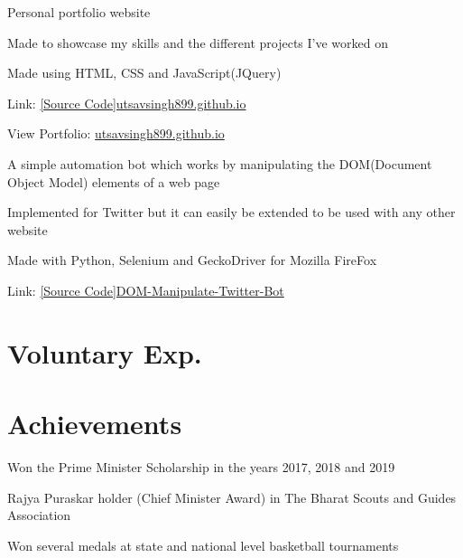 \documentclass[]{deedy-resume-openfont}
\begin{document}
\begin{minipage}[t]{0.66\textwidth}
\begin{tightemize}
\item Personal portfolio website
\item Made to showcase my skills and the different projects I've worked on
\item Made using HTML, CSS and JavaScript(JQuery)
\item Link: \href{https://github.com/utsavsingh899/utsavsingh899.github.io}{[Source Code]utsavsingh899.github.io}
\item View Portfolio: \href{https://utsavsingh899.github.io/}{utsavsingh899.github.io}
\end{tightemize}
\sectionsep

\begin{tightemize}
\item A simple automation bot which works by manipulating the DOM(Document Object Model) elements of a web page
\item Implemented for Twitter but it can easily be extended to be used with any other website
\item Made with Python, Selenium and GeckoDriver for Mozilla FireFox
\item Link: \href{https://github.com/utsavsingh899/DOM-Manipulate-Twitter-Bot}{[Source Code]DOM-Manipulate-Twitter-Bot}
\end{tightemize}
\sectionsep

%
%

\section{Voluntary Exp.}

\sectionsep

\section{Achievements}
\vspace{\topsep}
\begin{tightemize}
\item Won the Prime Minister Scholarship in the years 2017, 2018 and 2019
\item Rajya Puraskar holder (Chief Minister Award) in The Bharat Scouts and Guides
Association
\item Won several medals at state and national level basketball tournaments
\end{tightemize}


\end{minipage} 
\end{document}
